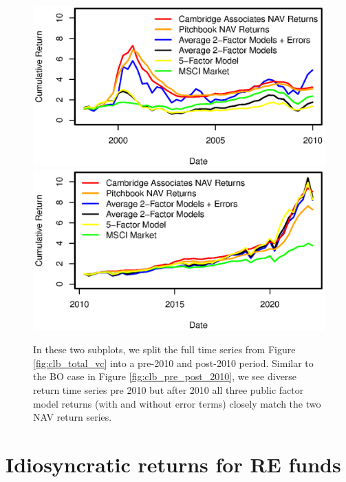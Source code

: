 \begin{figure}[H]
	\centering
	\includegraphics{Figures/XTotalErrorSeriesVCpre2010}
	\includegraphics{Figures/XTotalErrorSeriesVCpost2010}
	\caption{
		In these two subplots, we split the full time series from Figure \ref{fig:clb_total_vc} into a pre-2010 and post-2010 period.
		Similar to the BO case in Figure \ref{fig:clb_pre_post_2010}, we see diverse return time series pre 2010 but after 2010 all three public factor model returns (with and without error terms) closely match the two NAV return series.
	}
	\label{fig:clb_pre_post_2010_vc}
\end{figure}



\section{Idiosyncratic returns for RE funds}
\label{sec:re_errors}




